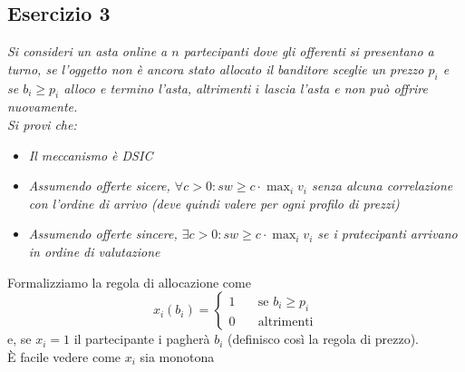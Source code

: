 \documentclass{article}
\begin{document}
        \subsection{Esercizio 3}
            \textit{Si consideri un asta online a $ n $ partecipanti dove gli offerenti si presentano a turno, se l'oggetto non è ancora stato allocato il banditore sceglie un prezzo $ p_i $ e se $ b_i \geq p_i $ alloco e termino l'asta, altrimenti $ i $ lascia l'asta e non può offrire nuovamente.}\\
            \textit{Si provi che:}
            \begin{itemize}
                \item \textit{Il meccanismo è DSIC}
                \item \textit{Assumendo offerte sicere, $ \forall c > 0 : sw \geq c \cdot \max_{i} v_i $ senza alcuna correlazione con l'ordine di arrivo (deve quindi valere per ogni profilo di prezzi)}
                \item \textit{Assumendo offerte sincere, $ \exists c > 0 : sw \geq c \cdot \max_{i} v_i $ se i pratecipanti arrivano in ordine di valutazione}
            \end{itemize}
            Formalizziamo la regola di allocazione come
            \[
                x_i(b_i) = \begin{cases}
                    1\quad &\text{se } b_i \geq p_i \\
                    0\quad &\text{altrimenti}
                \end{cases}    
            \]
            e, se $ x_i = 1 $ il partecipante i pagherà $ b_i $ (definisco così la regola di prezzo).\\
            È facile vedere come $ x_i $ sia monotona
\end{document}
